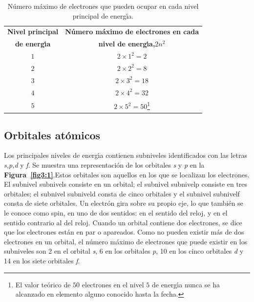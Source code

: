 \begin{table}[hbt]
\caption[Electrones en el nivel principal de energ\'{\i}a]{N\'umero m\'aximo de
electrones que pueden ocupar en cada nivel principal de energ\'{\i}a.}
\label{tab1.cap3}
\begin{minipage}{\linewidth}
\begin{center}
\begin{tabular}{ cc }\hline
\textbf{Nivel principal} &\textbf{N\'umero m\'aximo de electrones en cada}\\
\textbf{de energ\'{\i}a}& \textbf{nivel de energ\'{\i}a,}$2n^2$\\ \hline
$1$&$2\times 1^2 = 2$\\
$2$&$2\times 2^2 = 8$\\
$3$&$2\times 3^2 = 18$\\
$4$&$2\times 4^2 = 32$\\
$5$&$2\times 5^2 = 50$\footnote{El valor te\'orico de $50$ electrones en el
nivel $5$ de energ\'{\i}a nunca se  ha alcanzado en elemento alguno conocido hasta la
fecha.}\\ \hline 
\end{tabular}
\end{center}
\end{minipage}
\end{table}


\subsection{Orbitales at\'omicos}
Los principales niveles de energ\'{\i}a contienen subniveles identificados con
las letras \textit{s,p,d} y \textit{f}. Se muestra una representaci\'on de los orbitales \textit{s} y \textit{p} en la \textbf{Figura~\ref{fig3:1}}.Estos \gls{orbitales} 
 son aquellos en los que se localizan los electrones. El subnivel
\gls{subnivels} consiste en un orbital; el subnivel
\gls{subnivelp}  consiste en tres orbitales; el subnivel
\gls{subniveld} consta de cinco orbitales y el subnivel
\gls{subnivelf} consta de siete orbitales. Un electr\'on gira sobre su propio eje, lo que tambi\'en se le conoce como spin,  en uno de dos sentidos: en el sentido del reloj, y en el sentido contrario al del reloj. Cuando un orbital contiene dos electrones, se dice que los electrones est\'an en par o apareados. Como no pueden existir m\'as de dos electrones en un orbital, el n\'umero m\'aximo de electrones que puede existir en los subniveles son  2 en el orbital \textit{s}, 6 en los orbitales \textit{p}, 10 en los cinco orbitales \textit{d} y 14 en los siete orbitales \textit{f}.

